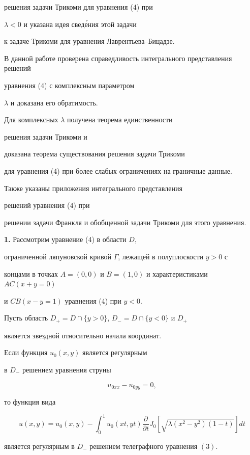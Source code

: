решения задачи Трикоми для уравнения (4) при 


$\lambda <0$ и указана идея свед\'ения этой задачи 


к задаче Трикоми для уравнения Лаврентьева--Бицадзе.





В данной работе проверена справедливость интегрального представления решений


уравнения (4) с комплексным параметром


$\lambda $ и доказана его обратимость. 


Для комплексных $\lambda$ получена теорема единственности


решения задачи Трикоми и 


доказана теорема существования решения задачи Трикоми


для уравнения (4) при более слабых ограничениях на граничные данные.


Также указаны приложения интегрального представления 


решений уравнения (4) при


решении задачи Франкля и обобщенной задачи Трикоми для этого уравнения.


\medskip





{\bf 1.} Рассмотрим уравнение (4) в области $D$,


ограниченной ляпуновской кривой $\Gamma$, лежащей в полуплоскости $y>0$ с


концами в точках $A{=}(0,0)$ и $B{=}(1,0)$ и характеристиками $AC(x+y=0)$


и $CB(x-y=1)$ уравнения (4) при $y<0$.


Пусть область $D_+ = D\cap \{y>0\}$, $D_- =D\cap \{y<0\}$ и $D_+$


является звездной относительно начала координат.





\begin{lem}


Если функция $u_0(x,y)$ является регулярным


в $D_-$ решением уравнения струны


\begin{equation}


u_{0xx}-u_{0yy}=0,


\end{equation}


то функция вида


\begin{equation}


u(x,y)=u_0(x,y)-\int_0^1 u_0(xt,yt)\frac {\partial }


{\partial t}J_0[\sqrt {\lambda (x^2-y^2)(1-t)}]dt


\end{equation}


является регулярным в $D_-$ решением телеграфного уравнения $(3)$.


\end{lem}






